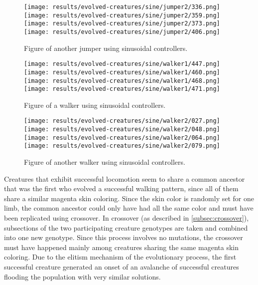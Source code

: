 \documentclass[main]{subfiles}
\begin{document}
\begin{figure}[tb]
\centering
\texttt{[image: results/evolved-creatures/sine/jumper2/336.png]}
\texttt{[image: results/evolved-creatures/sine/jumper2/359.png]}
\texttt{[image: results/evolved-creatures/sine/jumper2/373.png]}
\texttt{[image: results/evolved-creatures/sine/jumper2/406.png]}
\caption[Figure of the successful sinusoid controller creatures.]{Figure of another jumper using sinusoidal controllers.}
\label{figure:successfulcreatures-jumper2}
\end{figure}

\begin{figure}[tb]
\centering
\texttt{[image: results/evolved-creatures/sine/walker1/447.png]}
\texttt{[image: results/evolved-creatures/sine/walker1/460.png]}
\texttt{[image: results/evolved-creatures/sine/walker1/468.png]}
\texttt{[image: results/evolved-creatures/sine/walker1/471.png]}
\caption[Figure of the successful sinusoid controller creatures.]{Figure of a walker using sinusoidal controllers.}
\label{figure:successfulcreatures-walker1}
\end{figure}

\begin{figure}[tb]
\centering
\texttt{[image: results/evolved-creatures/sine/walker2/027.png]}
\texttt{[image: results/evolved-creatures/sine/walker2/048.png]}
\texttt{[image: results/evolved-creatures/sine/walker2/064.png]}
\texttt{[image: results/evolved-creatures/sine/walker2/079.png]}
\caption[Figure of the successful sinusoid controller creatures.]{Figure of another walker using sinusoidal controllers.}
\label{figure:successfulcreatures-walker2}
\end{figure}

Creatures that exhibit successful locomotion seem to share a common ancestor that was the first who evolved a successful walking pattern, since all of them share a similar magenta skin coloring. %
%
Since the skin color is randomly set for one limb, the common ancestor could only have had all the same color and must have been replicated using crossover. %
%
In crossover (as described in \ref{subsec:crossover}), subsections of the two participating creature genotypes are taken and combined into one new genotype. %
%
Since this process involves no mutations, the crossover must have happened mainly among creatures sharing the same magenta skin coloring. %
%
Due to the elitism mechanism of the evolutionary process, the first successful creature generated an onset of an avalanche of successful creatures flooding the population with very similar solutions. 
\end{document}
